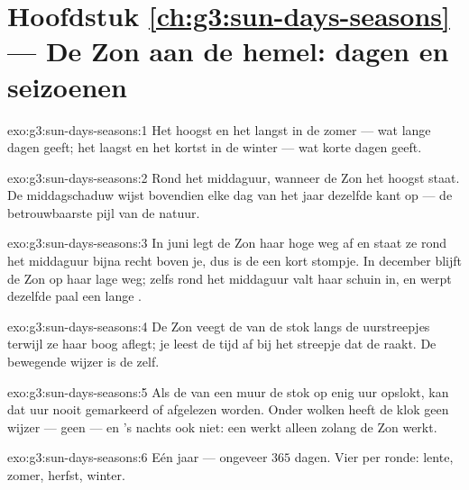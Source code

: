 \section*{Hoofdstuk \ref{ch:g3:sun-days-seasons} --- De Zon aan de hemel: dagen en seizoenen}

\begin{solution}{exo:g3:sun-days-seasons:1}
Het hoogst en het langst in de zomer --- wat lange dagen geeft; het
laagst en het kortst in de winter --- wat korte dagen geeft.
\end{solution}

\begin{solution}{exo:g3:sun-days-seasons:2}
Rond het middaguur, wanneer de Zon het hoogst staat. De
middagschaduw wijst bovendien elke dag van het jaar dezelfde kant op
--- de betrouwbaarste pijl van de natuur.
\end{solution}

\begin{solution}{exo:g3:sun-days-seasons:3}
In juni legt de Zon haar hoge weg af en staat ze rond het middaguur
bijna recht boven je, dus is de  een kort stompje. In december
blijft de Zon op haar lage weg; zelfs rond het middaguur valt haar
 schuin in, en werpt dezelfde paal een lange .
\end{solution}

\begin{solution}{exo:g3:sun-days-seasons:4}
De Zon veegt de  van de stok langs de uurstreepjes terwijl ze
haar boog aflegt; je leest de tijd af bij het streepje dat de
 raakt. De bewegende wijzer is de  zelf.
\end{solution}

\begin{solution}{exo:g3:sun-days-seasons:5}
Als de  van een muur de stok op enig uur opslokt, kan dat uur
nooit gemarkeerd of afgelezen worden. Onder wolken heeft de klok geen
wijzer --- geen  --- en 's nachts ook niet: een 
werkt alleen zolang de Zon werkt.
\end{solution}

\begin{solution}{exo:g3:sun-days-seasons:6}
Eén jaar --- ongeveer $365$ dagen. Vier  per ronde: lente,
zomer, herfst, winter.
\end{solution}

